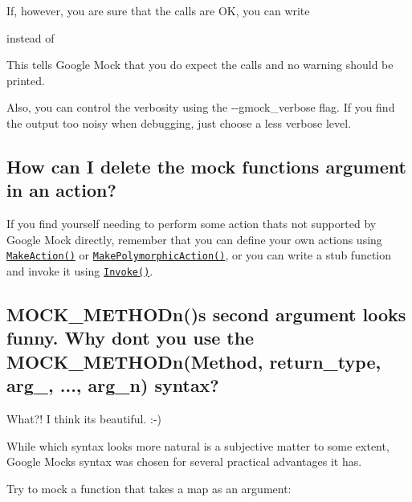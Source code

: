 If, however, you are sure that the calls are OK, you can write


\begin{DoxyCode}{0}
\end{DoxyCode}


instead of


\begin{DoxyCode}{0}
\end{DoxyCode}


This tells Google Mock that you do expect the calls and no warning should be printed.

Also, you can control the verbosity using the {\ttfamily -\/-\/gmock\+\_\+verbose} flag. If you find the output too noisy when debugging, just choose a less verbose level.

\subsection*{How can I delete the mock function\textquotesingle{}s argument in an action?}

If you find yourself needing to perform some action that\textquotesingle{}s not supported by Google Mock directly, remember that you can define your own actions using \href{CookBook.md#writing-new-actions}{\tt Make\+Action()} or \href{CookBook.md#writing_new_polymorphic_actions}{\tt Make\+Polymorphic\+Action()}, or you can write a stub function and invoke it using \href{CookBook.md#using-functions_methods_functors}{\tt Invoke()}.

\subsection*{M\+O\+C\+K\+\_\+\+M\+E\+T\+H\+O\+Dn()\textquotesingle{}s second argument looks funny. Why don\textquotesingle{}t you use the M\+O\+C\+K\+\_\+\+M\+E\+T\+H\+O\+Dn(\+Method, return\+\_\+type, arg\+\_, ..., arg\+\_\+n) syntax?}

What?! I think it\textquotesingle{}s beautiful. \+:-\/)

While which syntax looks more natural is a subjective matter to some extent, Google Mock\textquotesingle{}s syntax was chosen for several practical advantages it has.

Try to mock a function that takes a map as an argument\+: 
\begin{DoxyCode}{0}
\end{DoxyCode}



